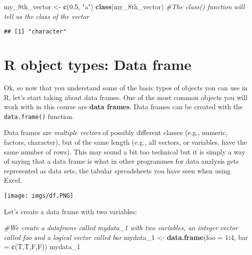 \documentclass[
]{book}
\newenvironment{Shaded}{\begin{snugshade}}{\end{snugshade}}
\newcommand{\AttributeTok}[1]{\textcolor[rgb]{0.13,0.29,0.53}{#1}}
\newcommand{\CommentTok}[1]{\textcolor[rgb]{0.56,0.35,0.01}{\textit{#1}}}
\newcommand{\DecValTok}[1]{\textcolor[rgb]{0.00,0.00,0.81}{#1}}
\newcommand{\FloatTok}[1]{\textcolor[rgb]{0.00,0.00,0.81}{#1}}
\newcommand{\FunctionTok}[1]{\textcolor[rgb]{0.13,0.29,0.53}{\textbf{#1}}}
\newcommand{\NormalTok}[1]{#1}
\newcommand{\OtherTok}[1]{\textcolor[rgb]{0.56,0.35,0.01}{#1}}
\newcommand{\SpecialCharTok}[1]{\textcolor[rgb]{0.81,0.36,0.00}{\textbf{#1}}}
\newcommand{\StringTok}[1]{\textcolor[rgb]{0.31,0.60,0.02}{#1}}
\begin{document}
\begin{Shaded}
\begin{Highlighting}[]
\NormalTok{my\_8th\_vector }\OtherTok{\textless{}{-}} \FunctionTok{c}\NormalTok{(}\FloatTok{0.5}\NormalTok{, }\StringTok{"a"}\NormalTok{)}
\FunctionTok{class}\NormalTok{(my\_8th\_vector) }\CommentTok{\#The class() function will tell us the class of the vector}
\end{Highlighting}
\end{Shaded}

\begin{verbatim}
## [1] "character"
\end{verbatim}

\section{R object types: Data frame}\label{r-object-types-data-frame}

Ok, so now that you understand some of the basic types of objects you can use in R, let's start taking about data frames. One of the most common objects you will work with in this course are \textbf{data frames}. Data frames can be created with the \texttt{data.frame()} function.

Data frames are \emph{multiple vectors} of possibly different classes (e.g., numeric, factors, character), but of the same length (e.g., all vectors, or variables, have the same number of rows). This may sound a bit too technical but it is simply a way of saying that a data frame is what in other programmes for data analysis gets represented as data sets, the tabular spreadsheets you have seen when using Excel.

\texttt{[image: imgs/df.PNG]}

Let's create a data frame with two variables:

\begin{Shaded}
\begin{Highlighting}[]
\CommentTok{\#We create a dataframe called mydata\_1 with two variables, an integer vector called foo and a logical vector called bar}
\NormalTok{mydata\_1 }\OtherTok{\textless{}{-}} \FunctionTok{data.frame}\NormalTok{(}\AttributeTok{foo =} \DecValTok{1}\SpecialCharTok{:}\DecValTok{4}\NormalTok{, }\AttributeTok{bar =} \FunctionTok{c}\NormalTok{(T,T,F,F))}
\NormalTok{mydata\_1}
\end{Highlighting}
\end{Shaded}
\end{document}
